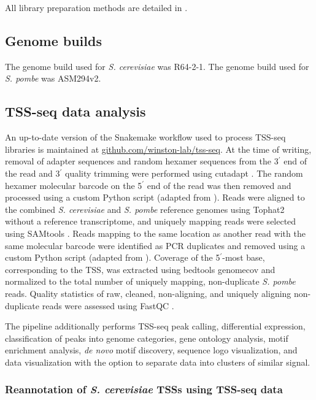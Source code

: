 All library preparation methods are detailed in \citet{doris2018}.

\subsection{Genome builds}

The genome build used for \textit{S. cerevisiae} was R64-2-1.
The genome build used for \textit{S. pombe} was ASM294v2.

\subsection{TSS-seq data analysis}

An up-to-date version of the Snakemake \citep{koster2012} workflow used to process TSS-seq libraries is maintained at \href{https://github.com/winston-lab/tss-seq}{github.com/winston-lab/tss-seq}.
At the time of writing, removal of adapter sequences and random hexamer sequences from the 3$^\prime$ end of the read and 3$^\prime$ quality trimming were performed using cutadapt \citep{martin2011}.
The random hexamer molecular barcode on the 5$^\prime$ end of the read was then removed and processed using a custom Python script (adapted from \citet{mayer2015}).
Reads were aligned to the combined \textit{S. cerevisiae} and \textit{S. pombe} reference genomes using Tophat2 \citep{kim2013} without a reference transcriptome, and uniquely mapping reads were selected using SAMtools \citep{li2009}.
Reads mapping to the same location as another read with the same molecular barcode were identified as PCR duplicates and removed using a custom Python script (adapted from \citet{mayer2015}).
Coverage of the 5$^\prime$-most base, corresponding to the TSS, was extracted using bedtools genomecov \citep{quinlan2010} and normalized to the total number of uniquely mapping, non-duplicate \textit{S. pombe} reads.
Quality statistics of raw, cleaned, non-aligning, and uniquely aligning non-duplicate reads were assessed using FastQC \citep{andrews2014}.

The pipeline additionally performs TSS-seq peak calling, differential expression, classification of peaks into genome categories, gene ontology analysis, motif enrichment analysis, \textit{de novo} motif discovery, sequence logo visualization, and data visualization with the option to separate data into clusters of similar signal.

\subsubsection{Reannotation of \textit{S. cerevisiae} TSSs using TSS-seq data}

